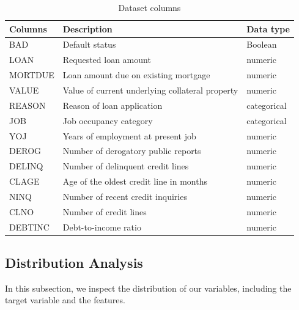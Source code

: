 \begin{table}[H]
    \small
    \setlength{\tabcolsep}{8pt}
    \renewcommand{\arraystretch}{1.3}
    \begin{center}
        \caption[Dataset columns]{Dataset columns}\label{tab:values}
    \begin{tabular}{@{} l p{8cm} l @{}}
    \toprule
    \textbf{Columns} & \textbf{Description} & \textbf{Data type}\\
    \midrule
    BAD & Default status & Boolean \\
    \hline
    LOAN & Requested loan amount & numeric \\
    \hline
    MORTDUE & Loan amount due on existing mortgage & numeric \\
    \hline
    VALUE & Value of current underlying collateral property & numeric \\
    \hline
    REASON & Reason of loan application & categorical \\
    \hline
    JOB & Job occupancy category & categorical \\
    \hline
    YOJ & Years of employment at present job & numeric \\
    \hline
    DEROG & Number of derogatory public reports & numeric \\
    \hline
    DELINQ & Number of delinquent credit lines & numeric \\
    \hline
    CLAGE & Age of the oldest credit line in months & numeric \\
    \hline
    NINQ & Number of recent credit inquiries & numeric \\
    \hline
    CLNO & Number of credit lines & numeric \\
    \hline
    DEBTINC & Debt-to-income ratio & numeric \\
    \bottomrule
    \end{tabular}
    \end{center}
    \begin{center} %
    \end{center}
\end{table}


\subsection{Distribution Analysis}
In this subsection, we inspect the distribution of our variables, including the target variable and the features.

